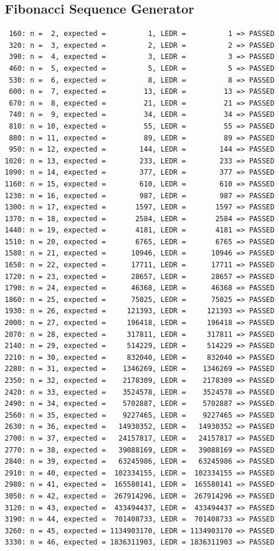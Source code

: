 \documentclass[12pt,a4paper,oneside]{book} %
\begin{document}
\subsection{Fibonacci Sequence Generator}
\label{fibonacci}
\begin{verbatim}
 160: n =  2, expected =          1, LEDR =          1 => PASSED
 320: n =  3, expected =          2, LEDR =          2 => PASSED
 390: n =  4, expected =          3, LEDR =          3 => PASSED
 460: n =  5, expected =          5, LEDR =          5 => PASSED
 530: n =  6, expected =          8, LEDR =          8 => PASSED
 600: n =  7, expected =         13, LEDR =         13 => PASSED
 670: n =  8, expected =         21, LEDR =         21 => PASSED
 740: n =  9, expected =         34, LEDR =         34 => PASSED
 810: n = 10, expected =         55, LEDR =         55 => PASSED
 880: n = 11, expected =         89, LEDR =         89 => PASSED
 950: n = 12, expected =        144, LEDR =        144 => PASSED
1020: n = 13, expected =        233, LEDR =        233 => PASSED
1090: n = 14, expected =        377, LEDR =        377 => PASSED
1160: n = 15, expected =        610, LEDR =        610 => PASSED
1230: n = 16, expected =        987, LEDR =        987 => PASSED
1300: n = 17, expected =       1597, LEDR =       1597 => PASSED
1370: n = 18, expected =       2584, LEDR =       2584 => PASSED
1440: n = 19, expected =       4181, LEDR =       4181 => PASSED
1510: n = 20, expected =       6765, LEDR =       6765 => PASSED
1580: n = 21, expected =      10946, LEDR =      10946 => PASSED
1650: n = 22, expected =      17711, LEDR =      17711 => PASSED
1720: n = 23, expected =      28657, LEDR =      28657 => PASSED
1790: n = 24, expected =      46368, LEDR =      46368 => PASSED
1860: n = 25, expected =      75025, LEDR =      75025 => PASSED
1930: n = 26, expected =     121393, LEDR =     121393 => PASSED
2000: n = 27, expected =     196418, LEDR =     196418 => PASSED
2070: n = 28, expected =     317811, LEDR =     317811 => PASSED
2140: n = 29, expected =     514229, LEDR =     514229 => PASSED
2210: n = 30, expected =     832040, LEDR =     832040 => PASSED
2280: n = 31, expected =    1346269, LEDR =    1346269 => PASSED
2350: n = 32, expected =    2178309, LEDR =    2178309 => PASSED
2420: n = 33, expected =    3524578, LEDR =    3524578 => PASSED
2490: n = 34, expected =    5702887, LEDR =    5702887 => PASSED
2560: n = 35, expected =    9227465, LEDR =    9227465 => PASSED
2630: n = 36, expected =   14930352, LEDR =   14930352 => PASSED
2700: n = 37, expected =   24157817, LEDR =   24157817 => PASSED
2770: n = 38, expected =   39088169, LEDR =   39088169 => PASSED
2840: n = 39, expected =   63245986, LEDR =   63245986 => PASSED
2910: n = 40, expected =  102334155, LEDR =  102334155 => PASSED
2980: n = 41, expected =  165580141, LEDR =  165580141 => PASSED
3050: n = 42, expected =  267914296, LEDR =  267914296 => PASSED
3120: n = 43, expected =  433494437, LEDR =  433494437 => PASSED
3190: n = 44, expected =  701408733, LEDR =  701408733 => PASSED
3260: n = 45, expected = 1134903170, LEDR = 1134903170 => PASSED
3330: n = 46, expected = 1836311903, LEDR = 1836311903 => PASSED
\end{verbatim}
\end{document}
